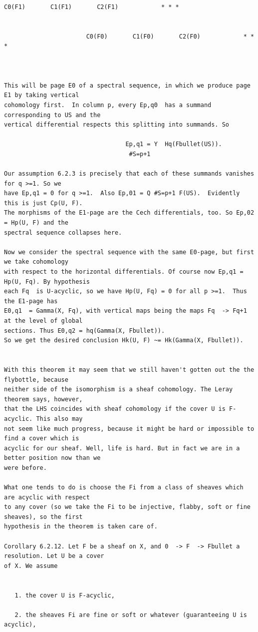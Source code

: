 \begin{Verbatim}[fontsize=\footnotesize]
                       C0(F1)       C1(F1)       C2(F1)            * * *


                       C0(F0)       C1(F0)       C2(F0)            * * *



This will be page E0 of a spectral sequence, in which we produce page E1 by taking vertical
cohomology first.  In column p, every Ep,q0  has a summand corresponding to US and the
vertical differential respects this splitting into summands. So

                                  Ep,q1 = Y  Hq(Fbullet(US)).
                                   #S=p+1

Our assumption 6.2.3 is precisely that each of these summands vanishes for q >=1. So we
have Ep,q1 = 0 for q >=1.  Also Ep,01 = Q #S=p+1 F(US).  Evidently this is just Cp(U, F).
The morphisms of the E1-page are the Cech differentials, too. So Ep,02 = Hp(U, F) and the
spectral sequence collapses here.

Now we consider the spectral sequence with the same E0-page, but first we take cohomology
with respect to the horizontal differentials. Of course now Ep,q1 = Hp(U, Fq). By hypothesis
each Fq  is U-acyclic, so we have Hp(U, Fq) = 0 for all p >=1.  Thus the E1-page has
E0,q1  = Gamma(X, Fq), with vertical maps being the maps Fq  -> Fq+1 at the level of global
sections. Thus E0,q2 = hq(Gamma(X, Fbullet)).
So we get the desired conclusion Hk(U, F) ~= Hk(Gamma(X, Fbullet)).


With this theorem it may seem that we still haven't gotten out the the flybottle, because
neither side of the isomorphism is a sheaf cohomology. The Leray theorem says, however,
that the LHS coincides with sheaf cohomology if the cover U is F-acyclic. This also may
not seem like much progress, because it might be hard or impossible to find a cover which is
acyclic for our sheaf. Well, life is hard. But in fact we are in a better position now than we
were before.

What one tends to do is choose the Fi from a class of sheaves which are acyclic with respect
to any cover (so we take the Fi to be injective, flabby, soft or fine sheaves), so the first
hypothesis in the theorem is taken care of.

Corollary 6.2.12. Let F be a sheaf on X, and 0  -> F  -> Fbullet a resolution. Let U be a cover
of X. We assume


   1. the cover U is F-acyclic,

   2. the sheaves Fi are fine or soft or whatever (guaranteeing U is acyclic),


\end{Verbatim}
